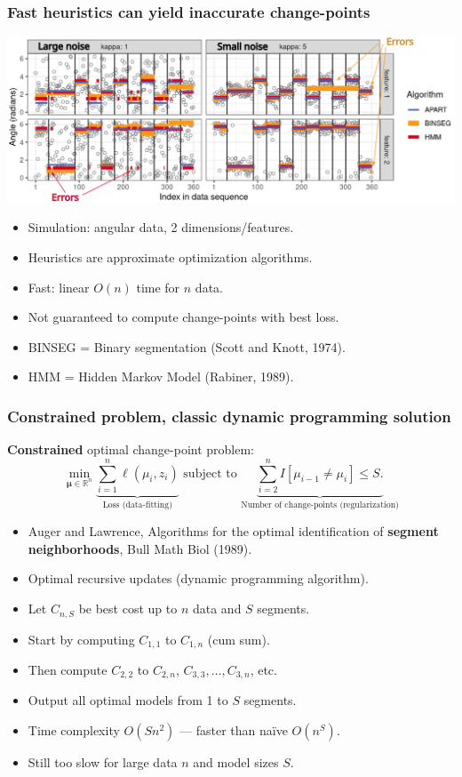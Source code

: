 \documentclass{beamer}
\newcommand{\RR}{\mathbb R}
\begin{document}
\begin{frame}
  \frametitle{Fast heuristics can yield inaccurate change-points}
  \includegraphics[width=\textwidth]{figure-2d-hmm-sim-noise-many-errors}
  \begin{itemize}
  \item Simulation: angular data, 2 dimensions/features.
  \item Heuristics are approximate optimization algorithms.
  \item Fast: linear $O(n)$ time for $n$ data.
  \item Not guaranteed to compute change-points with best loss.
  \item BINSEG = Binary segmentation (Scott and Knott, 1974).
  \item HMM = Hidden Markov Model (Rabiner, 1989).
  \end{itemize}
\end{frame}

\begin{frame}
  \frametitle{Constrained problem, classic dynamic programming solution}
  \textbf{Constrained} optimal change-point problem:
$$
\min_{
  \mathbf \mu\in\RR^{n}
}
\underbrace{\sum_{i=1}^{n} \ell( \mu_i,  z_i)}_{\text{Loss (data-fitting)}}\text{ subject to }\underbrace{\sum_{i=2}^n I[\mu_{i-1}\neq \mu_i] \leq S.}_{\text{Number of change-points (regularization)}}
$$
\begin{itemize}
\item Auger and Lawrence, Algorithms for the optimal identification of
  \textbf{segment neighborhoods}, Bull Math Biol (1989).
\item Optimal recursive updates (dynamic programming algorithm).
\item Let $C_{n,S}$ be best cost up to $n$ data and $S$ segments.
\item Start by computing $C_{1,1}$ to $C_{1,n}$ (cum sum).
\item Then compute $C_{2,2}$ to $C_{2,n}$, $C_{3,3},\dots,C_{3,n}$, etc.
\item Output all optimal models from 1 to $S$ segments.
\item Time complexity $O(S n^2)$ --- faster than naïve $O(n^S)$.
\item Still too slow for large data $n$ and model sizes $S$.
\end{itemize}
\end{frame}
\end{document}
